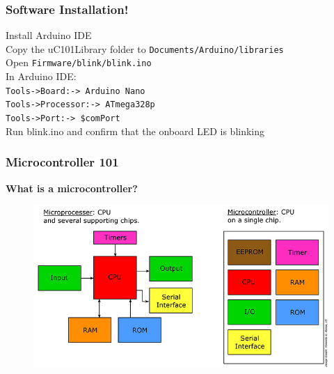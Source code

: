 \documentclass[t]{beamer}
\begin{document}


\begin{frame}[t]
\frametitle{Software Installation!}
Install Arduino  IDE\\
Copy the uC101Library folder to \texttt{Documents/Arduino/libraries}\\
Open \texttt{Firmware/blink/blink.ino}\\
In Arduino IDE:\\
\texttt{Tools->Board:-> Arduino Nano}\\
\texttt{Tools->Processor:-> ATmega328p}\\
\texttt{Tools->Port:-> \$comPort}\\
Run blink.ino and confirm that the onboard LED is blinking


\end{frame}

\begin{frame}[t]
\frametitle{Microcontroller 101}

\textbf{What is a microcontroller?} 

\begin{figure}
	\includegraphics[scale=0.4]{microProcessorVsController.jpg}
\end{figure}

\end{frame}

\end{document}
